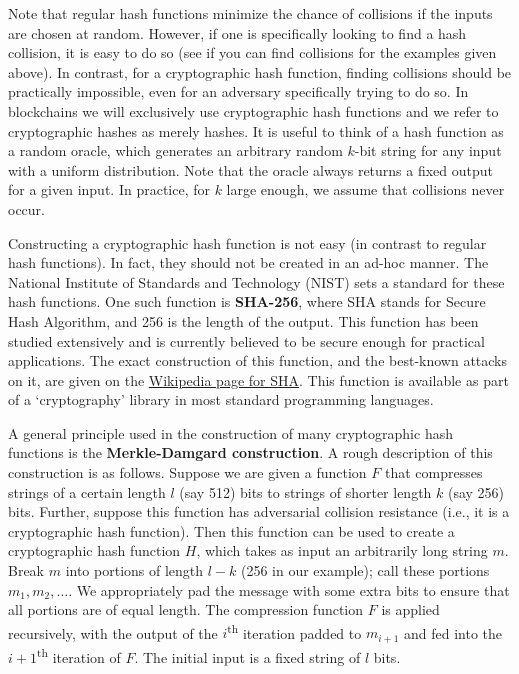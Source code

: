 \documentclass{article}
\begin{document}
Note that regular hash functions minimize the chance of collisions if the inputs are chosen at random. However, if one is specifically looking to find a hash collision, it is easy to do so (see if you can find collisions for the examples given above). In contrast, for a cryptographic hash function, finding collisions should be practically impossible, even for an adversary specifically trying to do so. In blockchains we will exclusively use cryptographic hash functions and we refer to cryptographic hashes as merely hashes. It is useful to think of a hash function as a random oracle, which generates an arbitrary random $k$-bit string for any input with a uniform distribution. Note that the oracle always returns a fixed output for a given input. In practice, for $k$ large enough, we assume that collisions never occur.

Constructing a cryptographic hash function is not easy (in contrast to regular hash functions). In fact, they should not be created in an ad-hoc manner. The National Institute of Standards and Technology (NIST) sets a standard for these hash functions. One such function is \textbf{SHA-256}, where SHA stands for Secure Hash Algorithm, and 256 is the length of the output. This function has been studied extensively and is currently believed to be secure enough for practical applications. The exact construction of this function, and the best-known attacks on it, are given on the \href{https://en.wikipedia.org/wiki/SHA-2}{Wikipedia page for SHA}. This function is available as part of a ‘cryptography’ library in most standard programming languages.

A general principle used in the construction of many cryptographic hash functions is the \textbf{Merkle-Damgard construction}. A rough description of this construction is as follows. Suppose we are given a function $F$ that compresses strings of a certain length $l$ (say 512) bits to strings of shorter length $k$ (say 256) bits. Further, suppose this function has adversarial collision resistance (i.e., it is a cryptographic hash function). Then this function can be used to create a cryptographic hash function $H$, which takes as input an arbitrarily long string $m$. Break $m$ into portions of length $l - k$ (256 in our example); call these portions $m_1, m_2, \ldots$. We appropriately pad the message with some extra bits to ensure that all portions are of equal length. The compression function $F$ is applied recursively, with the output of the $i$\textsuperscript{th} iteration padded to $m_{i+1}$ and fed into the $i+1$\textsuperscript{th} iteration of $F$. The initial input is a fixed string of $l$ bits.
\end{document}
